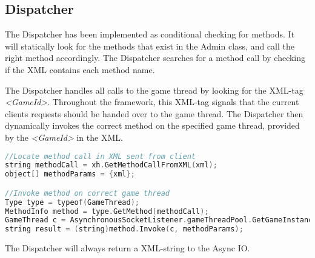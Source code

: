 \subsection{Dispatcher}
\label{chap:dispImplementation}
The Dispatcher has been implemented as conditional checking for methods. It will statically look for the methods that exist in the Admin class, and call the right method accordingly. The Dispatcher searches for a method call by checking if the XML contains each method name.

The Dispatcher handles all calls to the game thread by looking for the XML-tag \textit{<GameId>}. Throughout the framework, this XML-tag signals that the current clients requests should be handed over to the game thread. The Dispatcher then dynamically invokes the correct method on the specified game thread, provided by the \textit{<GameId>} in the XML. 

\begin{lstlisting}[caption={Dynamically invoking methods on game threads}, language=C]
//Locate method call in XML sent from client
string methodCall = xh.GetMethodCallFromXML(xml);
object[] methodParams = {xml};

//Invoke method on correct game thread
Type type = typeof(GameThread);
MethodInfo method = type.GetMethod(methodCall);
GameThread c = AsynchronousSocketListener.gameThreadPool.GetGameInstance(xh.GetGameIdFromXML(xml));
string result = (string)method.Invoke(c, methodParams);
\end{lstlisting}

The Dispatcher will always return a XML-string to the Async IO.